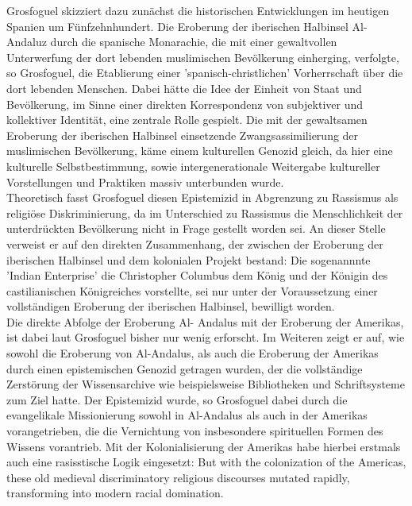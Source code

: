 \noindent Grosfoguel skizziert dazu zunächst die historischen Entwicklungen im heutigen
Spanien um Fünfzehnhundert. Die Eroberung der iberischen Halbinsel Al-Andaluz
durch die spanische Monarachie, die mit einer gewaltvollen Unterwerfung der
dort lebenden muslimischen Bevölkerung einherging, verfolgte, so Grosfoguel,
die Etablierung einer 'spanisch-christlichen' Vorherrschaft über die dort
lebenden Menschen. Dabei hätte die Idee der Einheit von Staat und Bevölkerung,
im Sinne einer direkten Korrespondenz von subjektiver und kollektiver
Identität, eine zentrale Rolle gespielt.\footnotemark
{} Die mit
der gewaltsamen Eroberung der iberischen Halbinsel einsetzende
Zwangsassimilierung der muslimischen Bevölkerung, käme einem kulturellen
Genozid gleich, da hier eine kulturelle Selbstbestimmung, sowie
intergenerationale Weitergabe kultureller Vorstellungen und Praktiken massiv
unterbunden wurde.\footnotemark {}\\

\noindent Theoretisch fasst Grosfoguel diesen Epistemizid in Abgrenzung zu Rassismus als
religiöse Diskriminierung, da im Unterschied zu Rassismus die Menschlichkeit
der unterdrückten Bevölkerung nicht in Frage gestellt worden sei.\footnotemark
{} An dieser Stelle verweist er auf den direkten Zusammenhang, der zwischen der Eroberung
der iberischen Halbinsel und dem kolonialen Projekt bestand: Die sogenannnte
'Indian Enterprise' die Christopher Columbus dem König und der Königin des
castilianischen Königreiches vorstellte, sei nur unter der Voraussetzung einer
vollständigen Eroberung der iberischen Halbinsel, bewilligt worden.\\

\noindent Die direkte Abfolge der Eroberung Al- Andalus mit der Eroberung der Amerikas,
ist dabei laut Grosfoguel bisher nur wenig erforscht.\footnotemark
{} Im Weiteren zeigt er
auf, wie sowohl die Eroberung von Al-Andalus, als auch die Eroberung der
Amerikas durch einen epistemischen Genozid getragen wurden, der die
vollständige Zerstörung der Wissensarchive wie beispielsweise Bibliotheken und
Schriftsysteme zum Ziel hatte.\footnotemark
{}  Der Epistemizid wurde, so Grosfoguel dabei
durch die evangelikale Missionierung sowohl in Al-Andalus als auch in der
Amerikas vorangetrieben, die die Vernichtung von insbesondere spirituellen
Formen des Wissens vorantrieb. Mit der Kolonialisierung der Amerikas habe
hierbei erstmals auch eine rasisstische Logik eingesetzt: \glqq But with the
colonization of the Americas, these old medieval discriminatory religious
discourses mutated rapidly, transforming into modern racial domination.\grqq
\footnotemark {}\\

